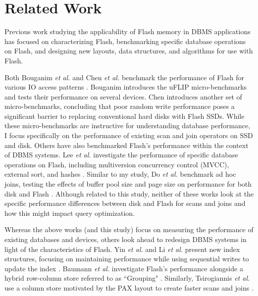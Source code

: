 \section{Related Work}
\label{sec:FlashOpti:RelatedWork}
Previous work studying the applicability of Flash memory in DBMS applications has focused on characterizing Flash, benchmarking specific database operations on Flash, and designing new layouts, data structures, and algorithms for use with Flash.

Both Bouganim \emph{et al.} and Chen \emph{et al.} benchmark the performance of Flash for various IO access patterns \cite{Bouganim09uflip:understanding, Chen2009}.
Bouganim introduces the uFLIP micro-benchmarks and tests their performance on several devices.
Chen introduces another set of micro-benchmarks, concluding that poor random write performance poses a significant barrier to replacing conventional hard disks with Flash SSDs.
While these micro-benchmarks are instructive for understanding database performance, I focus specifically on the performance of existing scan and join operators on SSD and disk.
Others have also benchmarked Flash's performance within the context of DBMS systems.
Lee \emph{et al.} investigate the performance of specific database operations on Flash, including multiversion concurrency control (MVCC), external sort, and hashes \cite{Lee2008}.
Similar to my study, Do \emph{et al.} benchmark ad hoc joins, testing the effects of buffer pool size and page size on performance for both disk and Flash \cite{Do2009}.
Although related to this study, neither of these works look at the specific performance differences between disk and Flash for scans and joins and how this might impact query optimization.

Whereas the above works (and this study) focus on measuring the performance of existing databases and devices, others look ahead to redesign DBMS systems in light of the characteristics of Flash.
Yin \emph{et al.} and Li \emph{et al.} present new index structures, focusing on maintaining performance while using sequential writes to update the index \cite{Yin2009, Li2009}.
Baumann \emph{et al.} investigate Flash's performance alongside a hybrid row-column store referred to as ``Grouping" \cite{Baumann2010}.
Similarly, Tsirogiannis \emph{et al.} use a column store motivated by the PAX layout to create faster scans and joins \cite{Tsirogiannis2009}.


